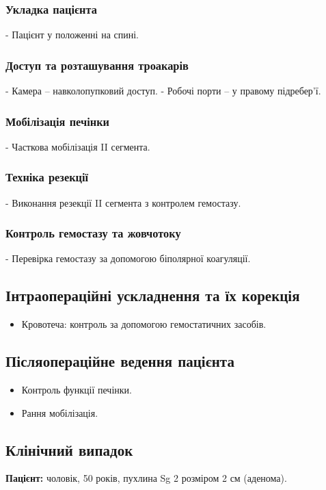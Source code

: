 \begin{refsection}
\subsubsection{Укладка пацієнта}
- Пацієнт у положенні на спині.

\subsubsection{Доступ та розташування троакарів}
- Камера – навколопупковий доступ.
- Робочі порти – у правому підребер'ї.

\subsubsection{Мобілізація печінки}
- Часткова мобілізація II сегмента.

\subsubsection{Техніка резекції}
- Виконання резекції II сегмента з контролем гемостазу.

\subsubsection{Контроль гемостазу та жовчотоку}
- Перевірка гемостазу за допомогою біполярної коагуляції.

\subsection{Інтраопераційні ускладнення та їх корекція}
\begin{itemize}
    \item Кровотеча: контроль за допомогою гемостатичних засобів.
\end{itemize}

\subsection{Післяопераційне ведення пацієнта}
\begin{itemize}
    \item Контроль функції печінки.
    \item Рання мобілізація.
\end{itemize}

\subsection{Клінічний випадок}
\textbf{Пацієнт:} чоловік, 50 років, пухлина Sg 2 розміром 2 см (аденома).


\end{refsection}
